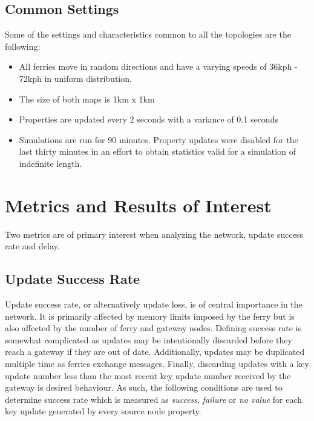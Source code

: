 \subsection{Common Settings}
\label{sec:commonsettings}

Some of the settings and characteristics common to all the topologies are the following:
\begin{itemize}
	\item All ferries move in random directions and have a varying speeds of 36kph - 72kph in uniform distribution.
	\item The size of both maps is 1km x 1km
	\item Properties are updated every 2 seconds with a variance of 0.1 seconds
	\item Simulations are run for 90 minutes. 
	Property updates were disabled for the last thirty minutes in an effort to obtain statistics valid for a simulation of indefinite length. 
\end{itemize}

\section{Metrics and Results of Interest }
\label{sec:metrics}

Two metrics are of primary interest when analyzing the network, update success rate and delay.

\subsection{Update Success Rate}
\label{sec:packetloss}

Update success rate, or alternatively update loss, is of central importance in the network.
It is primarily affected by memory limits imposed by the ferry but is also affected by the number of ferry and gateway nodes.
Defining success rate is somewhat complicated as updates may be intentionally discarded before they reach a gateway if they are out of date.
Additionally, updates may be duplicated multiple time as ferries exchange messages.
Finally, discarding updates with a key update number less than the most recent key update number received by the gateway is desired behaviour.
As such, the following conditions are used to determine success rate which is measured as \emph{success}, \emph{failure} or \emph{no value} for each key update generated by every source node property.

